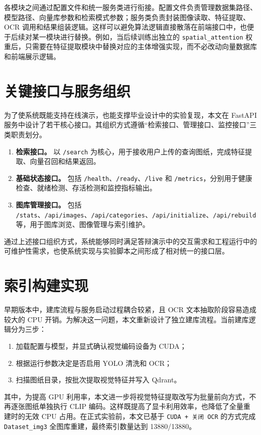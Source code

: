 各模块之间通过配置文件和统一服务类进行衔接。配置文件负责管理数据集路径、模型路径、向量库参数和检索模式参数；服务类负责封装图像读取、特征提取、OCR 调用和结果组装逻辑。这样可以避免算法逻辑直接散落在前端接口中，也便于后续对某一模块进行替换。例如，当后续训练出独立的 \texttt{spatial\_attention} 权重后，只需要在特征提取模块中替换对应的主体增强实现，而不必改动向量数据库和前端展示逻辑。

\section{关键接口与服务组织}

为了使系统既能支持在线演示，也能支撑毕业设计中的实验复现，本文在 FastAPI 服务中设计了若干核心接口。其组织方式遵循“检索接口、管理接口、监控接口”三类职责划分。

\begin{enumerate}
  \item \textbf{检索接口。} 以 \texttt{/search} 为核心，用于接收用户上传的查询图纸，完成特征提取、向量召回和结果返回。
  \item \textbf{基础状态接口。} 包括 \texttt{/health}、\texttt{/ready}、\texttt{/live} 和 \texttt{/metrics}，分别用于健康检查、就绪检测、存活检测和监控指标输出。
  \item \textbf{图库管理接口。} 包括 \texttt{/stats}、\texttt{/api/images}、\texttt{/api/categories}、\texttt{/api/initialize}、\texttt{/api/rebuild} 等，用于图库浏览、图像管理与索引维护。
\end{enumerate}

通过上述接口组织方式，系统能够同时满足答辩演示中的交互需求和工程运行中的可维护性需求，也使系统实现与实验脚本之间形成了相对统一的接口层。

\section{索引构建实现}

早期版本中，建库流程与服务启动过程耦合较紧，且 OCR 文本抽取阶段容易造成较大的 CPU 开销。为解决这一问题，本文重新设计了独立建库流程。当前建库逻辑分为三步：
\begin{enumerate}
  \item 加载配置与模型，并显式确认视觉编码设备为 CUDA；
  \item 根据运行参数决定是否启用 YOLO 清洗和 OCR；
  \item 扫描图纸目录，按批次提取视觉特征并写入 Qdrant。
\end{enumerate}

其中，为提高 GPU 利用率，本文进一步将视觉特征提取改写为批量前向方式，不再逐张图纸单独执行 CLIP 编码。这样既提高了显卡利用效率，也降低了全量重建时的无效 CPU 占用。在正式实验前，本文已基于 \texttt{CUDA + 关闭 OCR} 的方式完成 \texttt{Dataset\_img3} 全图库重建，最终索引数量达到 13880/13880。

